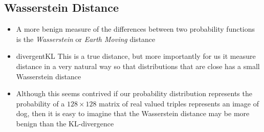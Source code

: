 
\begin{slide}
\section[-1]{Wasserstein Distance}

\begin{PauseHighLight}
  \begin{itemize}
  \item A more benign measure of the differences between two
    probability functions is the \emph{Wasserstein} or \emph{Earth
      Moving} distance\pause
  \item
    \begin{rightImage}{divergentKL}
    This is a true distance, but more importantly for us it
    measure distance in a very natural way so that distributions that
    are close has a small Wasserstein distance\pause
    \end{rightImage}
  \item Although this seems contrived if our probability distribution
    represents the probability of a $128\times128$ matrix of real
    valued triples represents an image of dog, then it is easy to
    imagine that the Wasserstein distance may be more benign than the
    KL-divergence\pause
  \end{itemize}
\end{PauseHighLight}

\end{slide}

